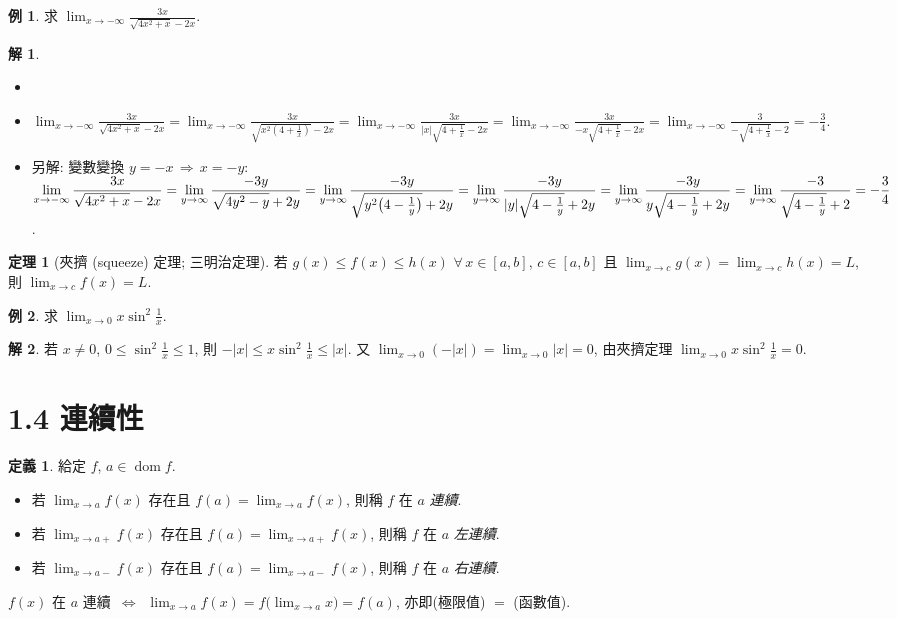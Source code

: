 \documentclass[12pt]{extarticle}
\newcommand{\ds}{\displaystyle}
\newcommand{\ie}{\,\Longrightarrow\,}
\newcommand{\ifff}{\,\Longleftrightarrow\,}
\DeclareMathOperator*{\dom}{dom}
\theoremstyle{definition}
\newtheorem*{dfn}{定義}
\newtheorem*{thm}{定理}
\newtheorem*{ex}{例}
\newtheorem*{sol}{解}
\begin{document}
\begin{ex}
  求 $\ds\lim_{x\to-\infty}\frac{3x}{\sqrt{4x^2 + x} - 2x}$. 
\end{ex}

\begin{sol}
  \begin{itemize}\setlength\itemsep{0em}
    \item[]
    \item $\ds\lim_{x\to-\infty}\frac{3x}{\sqrt{4x^2 + x} - 2x} = \lim_{x\to-\infty}\frac{3x}{\sqrt{x^2(4 + \frac{1}{x})} - 2x} = \lim_{x\to-\infty}\frac{3x}{|x|\sqrt{4 + \frac{1}{x}} - 2x} = \lim_{x\to-\infty}\frac{3x}{-x\sqrt{4 + \frac{1}{x}} - 2x} = \lim_{x\to-\infty}\frac{3}{-\sqrt{4 + \frac{1}{x}} - 2} = -\frac{3}{4}$. 
    \item 另解: 變數變換 $y = -x\ie x=-y$: $\ds\lim_{x\to-\infty}\frac{3x}{\sqrt{4x^2 + x} - 2x} = \lim_{y\to\infty}\frac{-3y}{\sqrt{4y^2 - y} + 2y} \\= \lim_{y\to\infty}\frac{-3y}{\sqrt{y^2\big(4 - \frac{1}{y}\big)} + 2y} = \lim_{y\to\infty}\frac{-3y}{|y|\sqrt{4 - \frac{1}{y}} + 2y} = \lim_{y\to\infty}\frac{-3y}{y\sqrt{4 - \frac{1}{y}} + 2y} =\lim_{y\to\infty}\frac{-3}{\sqrt{4 - \frac{1}{y}} + 2} = -\frac{3}{4}$. 
  \end{itemize}
\end{sol}

\begin{thm}[夾擠 (squeeze) 定理; 三明治定理]
  若 $g(x)\leqslant f(x)\leqslant h(x)$ $\forall\,x\in[a, b]$, $c\in[a, b]$ 且 $\ds\lim_{x\to c}g(x) = \lim_{x\to c}h(x) = L$, 則 $\ds\lim_{x\to c} f(x) = L$. 
\end{thm}

\begin{ex}
  求 $\ds\lim_{x\to 0}x\sin^2\frac{1}{x}$. 
\end{ex}

\begin{sol}
  若 $x\ne 0$, $\ds 0\leqslant\sin^2\frac{1}{x}\leqslant 1$, 則 $\ds-|x|\leqslant x\sin^2\frac{1}{x}\leqslant|x|$. 又 $\ds\lim_{x\to 0}(-|x|) = \lim_{x\to 0}|x| = 0$, 由夾擠定理 $\ds\lim_{x\to 0}x\sin^2\frac{1}{x} = 0$. 
\end{sol}

\section*{1.4 連續性}

\begin{dfn} 給定 $f$, $a\in\dom f$. 
  \begin{itemize}\setlength\itemsep{0em}
    \item 若 $\ds\lim_{x\to a} f(x)$ 存在且 $\ds f(a)=\lim_{x\to a}f(x)$, 則稱 $f$ 在 $a$ \emph{連續}.  
    \item 若 $\ds\lim_{x\to a+} f(x)$ 存在且 $\ds f(a)=\lim_{x\to a+}f(x)$, 則稱 $f$ 在 $a$ \emph{左連續}.  
    \item 若 $\ds\lim_{x\to a-} f(x)$ 存在且 $\ds f(a)=\lim_{x\to a-}f(x)$, 則稱 $f$ 在 $a$ \emph{右連續}.  
  \end{itemize}
  $f(x)$ 在 $a$ 連續 $\ifff$ $\ds\lim_{x\to a}f(x) = f\big(\lim_{x\to a}x\big) = f(a)$, 亦即(極限值) $=$ (函數值).
\end{dfn}
\end{document}
